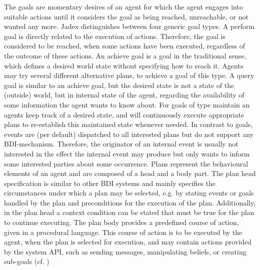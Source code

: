 The goals are momentary desires of an agent for which the agent engages into suitable actions until it considers the goal as being reached, unreachable, or not wanted any more.
Jadex distinguishes between four generic goal types.
A perform goal is directly related to the execution of actions.
Therefore, the goal is considered to be reached, when some actions have been executed, regardless of the outcome of these actions.
An achieve goal is a goal in the traditional sense, which defines a desired world state without specifying how to reach it.
Agents may try several different alternative plans, to achieve a goal of this type.
A query goal is similar to an achieve goal, but the desired state is not a state of the (outside) world, but in internal state of the agent, regarding the availability of some information the agent wants to know about.
For goals of type maintain an agents keep track of a desired state, and will continuously execute appropriate plans to re-establish this maintained state whenever needed.
In contrast to goals, events are (per default) dispatched to all interested plans but do not support any BDI-mechanism.
Therefore, the originator of an internal event is usually not interested in the effect the internal event may produce but only wants to inform some interested parties about some occurrence.
Plans represent the behavioural elements of an agent and are composed of a head and a body part.
The plan head specification is similar to other BDI systems and mainly specifies the circumstances under which a plan may be selected, e.g. by stating events or goals handled by the plan and preconditions for the execution of the plan.
Additionally, in the plan head a context condition can be stated that must be true for the plan to continue executing.
The plan body provides a predefined course of action, given in a procedural language.
This course of action is to be executed by the agent, when the plan is selected for execution, and may contain actions provided by the system API, such as sending messages, manipulating beliefs, or creating sub-goals (cf. \cite{braubach_jadex_2004})

